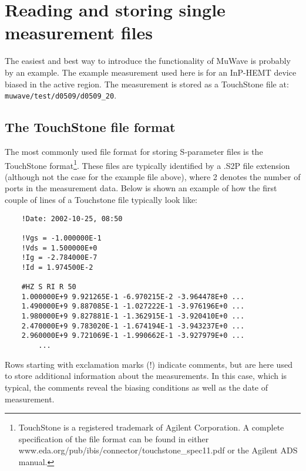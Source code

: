 %
\section{Reading and storing single measurement files}
The easiest and best way to introduce the functionality of MuWave
is probably by an example. The example measurement used here is
for an InP-HEMT device biased in the active region. The
measurement is stored as a TouchStone file at: \newline
\verb"muwave/test/d0509/d0509_20".

\subsection{The TouchStone file format}
The most commonly used file format for storing S-parameter files
is the TouchStone format\footnote{TouchStone is a registered
trademark of Agilent Corporation. A complete specification of the
file format can be found in either
www.eda.org/pub/ibis/connector/touchstone\_spec11.pdf or the
Agilent ADS manual.}. These files are typically identified by a
.S2P file extension (although not the case for the example file
above), where 2 denotes the number of ports in the measurement
data. Below is shown an example of how the first couple of lines
of a Touchstone file typically look like:
\begin{small}
\begin{verbatim}
    !Date: 2002-10-25, 08:50

    !Vgs = -1.000000E-1
    !Vds = 1.500000E+0
    !Ig = -2.784000E-7
    !Id = 1.974500E-2

    #HZ S RI R 50
    1.000000E+9 9.921265E-1 -6.970215E-2 -3.964478E+0 ...
    1.490000E+9 9.887085E-1 -1.027222E-1 -3.976196E+0 ...
    1.980000E+9 9.827881E-1 -1.362915E-1 -3.920410E+0 ...
    2.470000E+9 9.783020E-1 -1.674194E-1 -3.943237E+0 ...
    2.960000E+9 9.721069E-1 -1.990662E-1 -3.927979E+0 ...
        ...
\end{verbatim}
\end{small}
Rows starting with exclamation marks (!) indicate comments, but
are here used to store additional information about the
measurements. In this case, which is typical, the comments reveal
the biasing conditions as well as the date of measurement.


